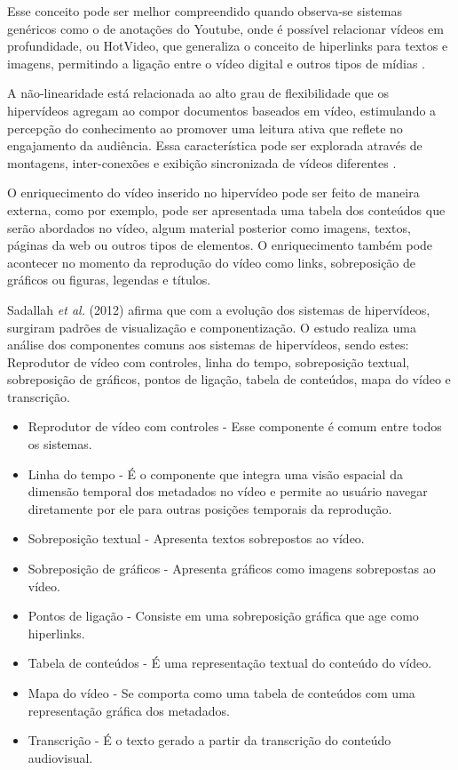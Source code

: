 Esse conceito pode ser melhor compreendido quando observa-se sistemas genéricos como o de anotações do Youtube, onde é possível relacionar vídeos em profundidade, ou HotVideo, que generaliza o conceito de hiperlinks para textos e imagens, permitindo a ligação entre o vídeo digital e outros tipos de mídias \cite{sadallah2012, finke2004, faga2010}.

A não-linearidade está relacionada ao alto grau de flexibilidade que os hipervídeos agregam ao compor documentos baseados em vídeo, estimulando a percepção do conhecimento ao promover uma leitura ativa que reflete no engajamento da audiência. Essa característica pode ser explorada através de montagens, inter-conexões e exibição sincronizada de vídeos diferentes \cite{sadallah2012}.

O enriquecimento do vídeo inserido no hipervídeo pode ser feito de maneira externa, como por exemplo, pode ser apresentada uma tabela dos conteúdos que serão abordados no vídeo, algum material posterior como imagens, textos, páginas da web ou outros tipos de elementos. O enriquecimento também pode acontecer no momento da reprodução do vídeo como links, sobreposição de gráficos ou figuras, legendas e títulos.

Sadallah \textit{et al.} (2012) afirma que com a evolução dos sistemas de hipervídeos, surgiram padrões de visualização e componentização. O estudo realiza uma análise dos componentes comuns aos sistemas de hipervídeos, sendo estes: Reprodutor de vídeo com controles, linha do tempo, sobreposição textual, sobreposição de gráficos, pontos de ligação, tabela de conteúdos, mapa do vídeo e transcrição.

\begin{itemize}
	\item Reprodutor de vídeo com controles - Esse componente é comum entre todos os sistemas.
	\item Linha do tempo - É o componente que integra uma visão espacial da dimensão temporal dos metadados no vídeo e permite ao usuário navegar diretamente por ele para outras posições temporais da reprodução.
	\item Sobreposição textual - Apresenta textos sobrepostos ao vídeo.
	\item Sobreposição de gráficos - Apresenta gráficos como imagens sobrepostas ao vídeo.
	\item Pontos de ligação - Consiste em uma sobreposição gráfica que age como hiperlinks.
	\item Tabela de conteúdos - É uma representação textual do conteúdo do vídeo.
	\item Mapa do vídeo - Se comporta como uma tabela de conteúdos com uma representação gráfica dos metadados.
	\item Transcrição - É o texto gerado a partir da transcrição do conteúdo audiovisual.
\end{itemize} 

